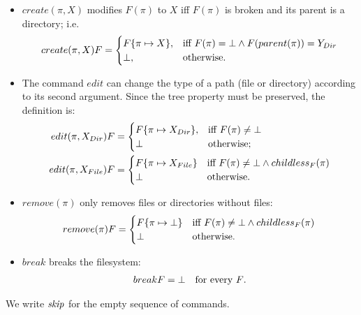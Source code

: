 \begin{itemize}
\item
\(create(\pi,X)\) modifies \(F(\pi)\) to \(X\) iff
\(F(\pi)\) is broken and its parent is a directory; i.e.
\[create(\pi,X)F=
\begin{cases}
F\{\pi\mapsto X\}, &\mbox{iff~} F(\pi)=\bot
\wedge F(parent(\pi))=Y_{Dir}\\
\bot, &\mbox{otherwise.}
\end{cases}\]
\item
The command \(edit\) can change the type of a path (file or
directory) according to its second argument.
Since the tree property must be preserved, the definition is:
\begin{align*}
edit(\pi,X_{Dir})F&=
\begin{cases}
F\{\pi\mapsto X_{Dir}\}, &\mbox{iff~}
F(\pi)\neq\bot\\
\bot &\mbox{otherwise;}
\end{cases}\\
edit(\pi,X_{File})F&=
\begin{cases}
F\{\pi\mapsto X_{File}\} &\mbox{iff~}
F(\pi)\neq\bot\wedge childless_F(\pi)\\
\bot &\mbox{otherwise.}
\end{cases}
\end{align*}
\item
\(remove(\pi)\) only removes files or directories without files:
\[remove(\pi)F=
\begin{cases}  
F\{\pi\mapsto\bot\} &\mbox{iff~}
F(\pi)\neq\bot \wedge childless_F(\pi)\\
\bot &\mbox{otherwise.}
\end{cases}\]
\item
\(break\) breaks the filesystem:
\[\begin{array}{r@{}ll}
breakF&{}=\ud &\mbox{for every $F$.}\end{array}\]
\end{itemize}

We write \(\mathit{skip}\) for the empty sequence of commands.

